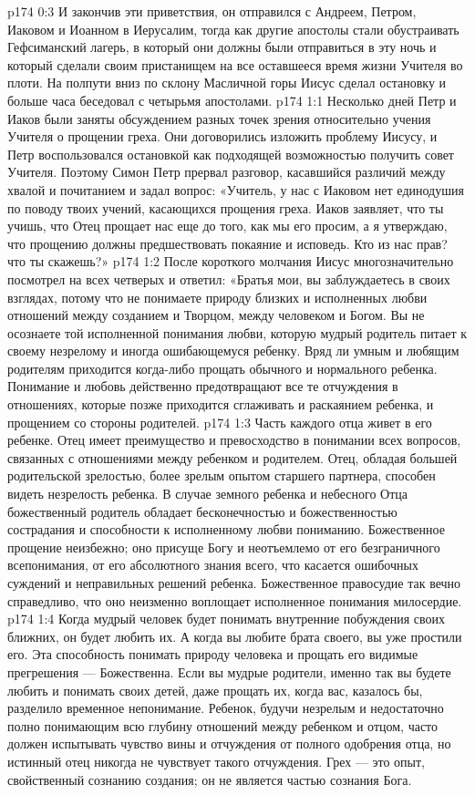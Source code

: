 \vs p174 0:3 И закончив эти приветствия, он отправился с Андреем, Петром, Иаковом и Иоанном в Иерусалим, тогда как другие апостолы стали обустраивать Гефсиманский лагерь, в который они должны были отправиться в эту ночь и который сделали своим пристанищем на все оставшееся время жизни Учителя во плоти. На полпути вниз по склону Масличной горы Иисус сделал остановку и больше часа беседовал с четырьмя апостолами.
\vs p174 1:1 Несколько дней Петр и Иаков были заняты обсуждением разных точек зрения относительно учения Учителя о прощении греха. Они договорились изложить проблему Иисусу, и Петр воспользовался остановкой как подходящей возможностью получить совет Учителя. Поэтому Симон Петр прервал разговор, касавшийся различий между хвалой и почитанием и задал вопрос: «Учитель, у нас с Иаковом нет единодушия по поводу твоих учений, касающихся прощения греха. Иаков заявляет, что ты учишь, что Отец прощает нас еще до того, как мы его просим, а я утверждаю, что прощению должны предшествовать покаяние и исповедь. Кто из нас прав? что ты скажешь?»
\vs p174 1:2 После короткого молчания Иисус многозначительно посмотрел на всех четверых и ответил: «Братья мои, вы заблуждаетесь в своих взглядах, потому что не понимаете природу близких и исполненных любви отношений между созданием и Творцом, между человеком и Богом. Вы не осознаете той исполненной понимания любви, которую мудрый родитель питает к своему незрелому и иногда ошибающемуся ребенку. Вряд ли умным и любящим родителям приходится когда\hyp{}либо прощать обычного и нормального ребенка. Понимание и любовь действенно предотвращают все те отчуждения в отношениях, которые позже приходится сглаживать и раскаянием ребенка, и прощением со стороны родителей.
\vs p174 1:3 Часть каждого отца живет в его ребенке. Отец имеет преимущество и превосходство в понимании всех вопросов, связанных с отношениями между ребенком и родителем. Отец, обладая большей родительской зрелостью, более зрелым опытом старшего партнера, способен видеть незрелость ребенка. В случае земного ребенка и небесного Отца божественный родитель обладает бесконечностью и божественностью сострадания и способности к исполненному любви пониманию. Божественное прощение неизбежно; оно присуще Богу и неотъемлемо от его безграничного всепонимания, от его абсолютного знания всего, что касается ошибочных суждений и неправильных решений ребенка. Божественное правосудие так вечно справедливо, что оно неизменно воплощает исполненное понимания милосердие.
\vs p174 1:4 Когда мудрый человек будет понимать внутренние побуждения своих ближних, он будет любить их. А когда вы любите брата своего, вы уже простили его. Эта способность понимать природу человека и прощать его видимые прегрешения --- Божественна. Если вы мудрые родители, именно так вы будете любить и понимать своих детей, даже прощать их, когда вас, казалось бы, разделило временное непонимание. Ребенок, будучи незрелым и недостаточно полно понимающим всю глубину отношений между ребенком и отцом, часто должен испытывать чувство вины и отчуждения от полного одобрения отца, но истинный отец никогда не чувствует такого отчуждения. Грех --- это опыт, свойственный сознанию создания; он не является частью сознания Бога.
